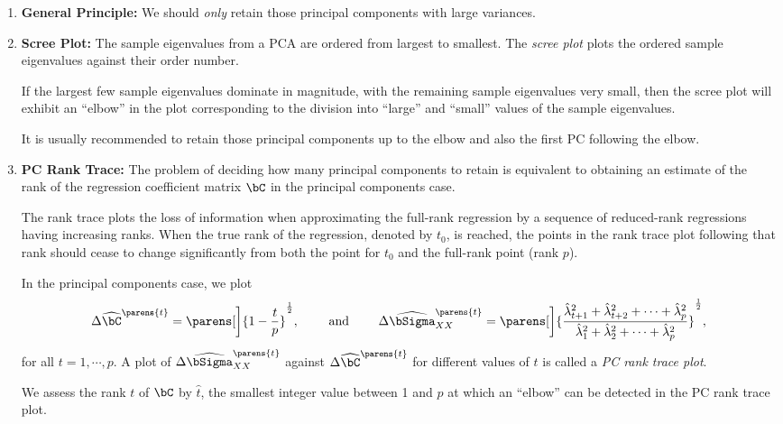 \documentclass[12pt]{article}
\begin{document}
\begin{enumerate}[label=\textbf{\arabic*.}]

	\item \textbf{General Principle:} We should \emph{only} retain those principal components with large variances. 
	
	\item \textbf{Scree Plot:} The sample eigenvalues from a PCA are ordered from largest to smallest. The \emph{scree plot} plots the ordered sample eigenvalues against their order number. 
	
	If the largest few sample eigenvalues dominate in magnitude, with the remaining sample eigenvalues very small, then the scree plot will exhibit an ``elbow'' in the plot corresponding to the division into ``large'' and ``small'' values of the sample eigenvalues. 
	
	It is usually recommended to retain those principal components up to the elbow and also the first PC following the elbow. 
	
	\item \textbf{PC Rank Trace:} The problem of deciding how many principal components to retain is equivalent to obtaining an estimate of the rank of the regression coefficient matrix $\bC$ in the principal components case. 
	
	The rank trace plots the loss of information when approximating the full-rank regression by a sequence of reduced-rank regressions having increasing ranks. When the true rank of the regression, denoted by $t_0$, is reached, the points in the rank trace plot following that rank should cease to change significantly from both the point for $t_0$ and the full-rank point (rank $p$). 
	
	In the principal components case, we plot 
	\begin{align*}
		\Delta \widehat{\bC}^{\parens{t}} = \parens[\bigg]{1 - \frac{t}{p}}^{\frac{1}{2}}, \qquad \text{ and } \qquad \Delta \widehat{\bSigma}_{XX}^{\parens{t}} = \parens[\bigg]{\frac{\hat{\lambda}_{t+1}^2 + \hat{\lambda}_{t+2}^2 + \cdots + \hat{\lambda}_{p}^2}{\hat{\lambda}_{1}^2 + \hat{\lambda}_{2}^2 + \cdots + \hat{\lambda}_{p}^2}}^{\frac{1}{2}}, 
	\end{align*}
	for all $t = 1, \cdots, p$. A plot of $\Delta \widehat{\bSigma}_{XX}^{\parens{t}}$ against $\Delta \widehat{\bC}^{\parens{t}}$ for different values of $t$ is called a \textit{PC rank trace plot}. 
	
	We assess the rank $t$ of $\bC$ by $\hat{t}$, the smallest integer value between 1 and $p$ at which an ``elbow'' can be detected in the PC rank trace plot. 

\end{enumerate}
\end{document}
